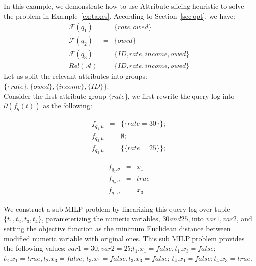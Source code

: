 \begin{example}\label{ex:heurstic}
In this example, we demonstrate how to use Attribute-slicing heuristic to
solve the problem in Example~\ref{ex:taxes}. According to
Section~\ref{sec:opt}, we have:
\begin{eqnarray*}
\mathcal{F}(q_1) &=& \{rate, owed \} \\
\mathcal{F}(q_2) &=& \{owed\} \\
\mathcal{F}(q_3) &=& \{ID, rate, income, owed\}\\
Rel(\mathcal{A}) &=& \{ID, rate, income, owed\}
\end{eqnarray*}
Let us split the relevant attributes into groups: \\ 
$\{\{rate\}, \{owed\}, \{income\}, \{ID\}\}$.\\
Consider the first attribute group $\{rate\}$, we 
first rewrite the query log into $\partial(f_q(t))$ as the following:\\
\begin{minipage}{0.7\textwidth}
    \begin{minipage}[t]{0.2\textwidth}
        \begin{align*}
            f_{q_1.\mu} &=& \{\{rate = 30\}\}; \\
f_{q_2.\mu} &=& \emptyset;  \\
f_{q_3.\mu} &=& \{\{rate = 25\}\};
        \end{align*}
    \end{minipage}
    \hspace{4em}
    \begin{minipage}[t]{0.2\textwidth}
        \begin{align*}
           f_{q_1.\sigma} &=& x_1\\
            f_{q_2.\sigma} &=& true\\
           f_{q_1.\sigma} &=& x_3
        \end{align*}
    \end{minipage}
\end{minipage}

\smallskip

\indent We construct a sub MILP problem by linearizing
this query log over tuple $\{t_1, t_2, t_3, t_4\}$, parameterizing
the numeric variables, $30 and 25$, into $var1, var2$,
and setting the objective function as the minimum Euclidean
distance between modified numeric variable with original ones.
This sub MILP problem provides the following values: $var1 = 30, 
var2 = 25$;$t_1.x_1 = false, t_1.x_3 = false$; $ t_2.x_1 = true, 
t_2.x_3 = false$; $t_3.x_1 = false, t_3.x_3 = false$;
$t_4.x_1 = false; t_4.x_3 = true$.


\end{example}
